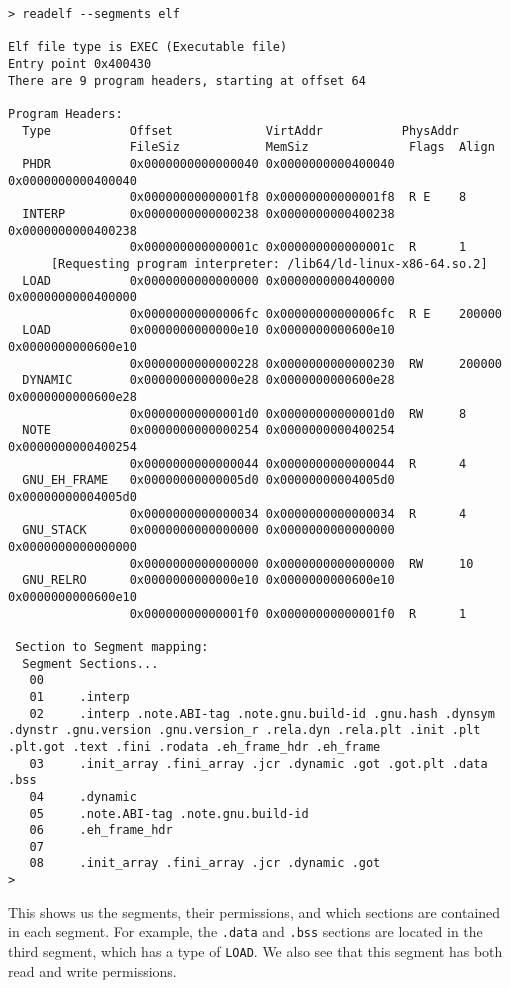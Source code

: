 \documentclass{article}
\begin{document}
\begin{lstlisting}
> readelf --segments elf

Elf file type is EXEC (Executable file)
Entry point 0x400430
There are 9 program headers, starting at offset 64

Program Headers:
  Type           Offset             VirtAddr           PhysAddr
                 FileSiz            MemSiz              Flags  Align
  PHDR           0x0000000000000040 0x0000000000400040 0x0000000000400040
                 0x00000000000001f8 0x00000000000001f8  R E    8
  INTERP         0x0000000000000238 0x0000000000400238 0x0000000000400238
                 0x000000000000001c 0x000000000000001c  R      1
      [Requesting program interpreter: /lib64/ld-linux-x86-64.so.2]
  LOAD           0x0000000000000000 0x0000000000400000 0x0000000000400000
                 0x00000000000006fc 0x00000000000006fc  R E    200000
  LOAD           0x0000000000000e10 0x0000000000600e10 0x0000000000600e10
                 0x0000000000000228 0x0000000000000230  RW     200000
  DYNAMIC        0x0000000000000e28 0x0000000000600e28 0x0000000000600e28
                 0x00000000000001d0 0x00000000000001d0  RW     8
  NOTE           0x0000000000000254 0x0000000000400254 0x0000000000400254
                 0x0000000000000044 0x0000000000000044  R      4
  GNU_EH_FRAME   0x00000000000005d0 0x00000000004005d0 0x00000000004005d0
                 0x0000000000000034 0x0000000000000034  R      4
  GNU_STACK      0x0000000000000000 0x0000000000000000 0x0000000000000000
                 0x0000000000000000 0x0000000000000000  RW     10
  GNU_RELRO      0x0000000000000e10 0x0000000000600e10 0x0000000000600e10
                 0x00000000000001f0 0x00000000000001f0  R      1

 Section to Segment mapping:
  Segment Sections...
   00     
   01     .interp 
   02     .interp .note.ABI-tag .note.gnu.build-id .gnu.hash .dynsym .dynstr .gnu.version .gnu.version_r .rela.dyn .rela.plt .init .plt .plt.got .text .fini .rodata .eh_frame_hdr .eh_frame 
   03     .init_array .fini_array .jcr .dynamic .got .got.plt .data .bss 
   04     .dynamic 
   05     .note.ABI-tag .note.gnu.build-id 
   06     .eh_frame_hdr 
   07     
   08     .init_array .fini_array .jcr .dynamic .got 
> 
\end{lstlisting}

This shows us the segments, their permissions, and which sections are contained
in each segment. For example, the \texttt{.data} and \texttt{.bss} sections are
located in the third segment, which has a type of \texttt{LOAD}. We also see
that this segment has both read and write permissions.
\end{document}
